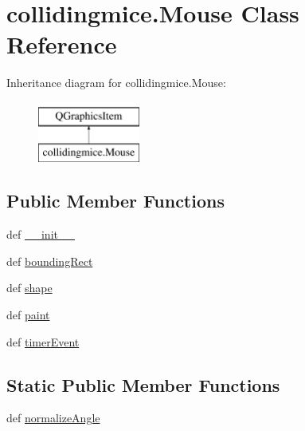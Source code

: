\hypertarget{classcollidingmice_1_1Mouse}{}\section{collidingmice.\+Mouse Class Reference}
\label{classcollidingmice_1_1Mouse}
Inheritance diagram for collidingmice.\+Mouse\+:\begin{figure}[H]
\begin{center}
\leavevmode
\includegraphics[height=2.000000cm]{classcollidingmice_1_1Mouse}
\end{center}
\end{figure}
\subsection*{Public Member Functions}
\begin{DoxyCompactItemize}
\item 
def \hyperlink{classcollidingmice_1_1Mouse_ad369bfdc6fa1d712ca70c46ca535302f}{\+\_\+\+\_\+init\+\_\+\+\_\+}
\item 
def \hyperlink{classcollidingmice_1_1Mouse_a0601a676be20bf530f21b6e46c00bedb}{bounding\+Rect}
\item 
def \hyperlink{classcollidingmice_1_1Mouse_a8dd6b298b3a4b6606572e38847427d93}{shape}
\item 
def \hyperlink{classcollidingmice_1_1Mouse_a27fd3914b17eeca2647b19b0ead8d8e2}{paint}
\item 
def \hyperlink{classcollidingmice_1_1Mouse_a296b9a0fe19f010b704e440ce991137c}{timer\+Event}
\end{DoxyCompactItemize}
\subsection*{Static Public Member Functions}
\begin{DoxyCompactItemize}
\item 
def \hyperlink{classcollidingmice_1_1Mouse_aa7a1af9cf6130c8d61183a89868aeb27}{normalize\+Angle}
\end{DoxyCompactItemize}
